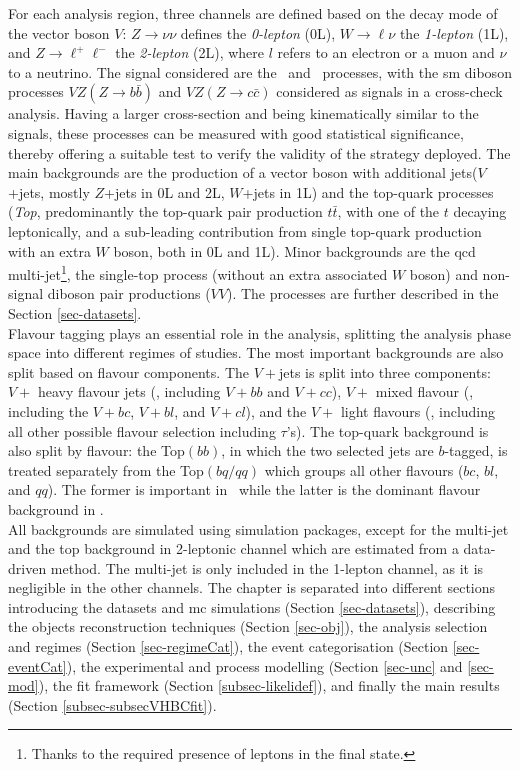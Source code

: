 For each analysis region, three channels are defined based on the decay mode of the vector boson $V$: $Z \rightarrow \nu \nu$ defines the \textit{0-lepton} (0L), $W \rightarrow \ell \nu $ the \textit{1-lepton} (1L), and $Z \rightarrow\ell^+\ell^-$ the \textit{2-lepton} (2L), where $l$ refers to an electron or a muon and $\nu$ to a neutrino. The signal considered are the  \vhb\ and \vhc\ processes, with the \gls{sm} diboson processes $VZ (Z\rightarrow b\bar{b})$ and $VZ (Z\rightarrow c\bar{c})$ considered as signals in a cross-check analysis. Having a larger cross-section and being kinematically similar to the signals, these processes can be measured with good statistical significance, thereby offering a suitable test to verify the validity of the strategy deployed. The main backgrounds are the production of a vector boson with additional jets($V$+jets, mostly $Z$+jets in 0L and 2L, $W$+jets in 1L) and the top-quark processes (\textit{Top}, predominantly the top-quark pair production $t\bar{t}$, with one of the $t$ decaying leptonically, and a sub-leading contribution from single top-quark production with an extra $W$ boson, both in 0L and 1L). Minor backgrounds are the \gls{qcd} multi-jet\footnote{Thanks to the required presence of leptons in the final state.}, the single-top process (without an extra associated $W$ boson) and non-signal diboson pair productions ($VV$). The processes are further described in the Section \ref{sec-datasets}. \\ 

Flavour tagging plays an essential role in the analysis, splitting the analysis phase space into different regimes of studies. The most important backgrounds are also split based on flavour components. The $V+$jets is split into three components: $V+$ heavy flavour jets (\vhf, including $V+bb$ and $V+cc$), $V+$ mixed flavour (\vmf, including the $V+bc$, $V+bl$, and $V+cl$), and the $V+$ light flavours (\vlf, including all other possible flavour selection including $\tau$'s). The top-quark background is also split by flavour: the Top$(bb)$, in which the two selected jets are $b$-tagged, is treated separately from the Top$(bq/qq)$ which groups all other flavours ($bc$, $bl$, and $qq$). The former is important in \vhb\ while the latter is the dominant flavour background in \vhc. \\

All backgrounds are simulated using  simulation packages, except for the multi-jet and the top background in 2-leptonic channel which are estimated from a data-driven method. The multi-jet is only included in the 1-lepton channel, as it is negligible in the other channels. The chapter is separated into different sections introducing the datasets and \gls{mc} simulations (Section \ref{sec-datasets}), describing the objects reconstruction techniques (Section \ref{sec-obj}), the analysis selection and regimes (Section \ref{sec-regimeCat}), the event categorisation (Section \ref{sec-eventCat}), the experimental and process modelling (Section \ref{sec-unc} and \ref{sec-mod}), the fit framework (Section \ref{subsec-likelidef}), and finally the main results (Section \ref{subsec-subsecVHBCfit}).

